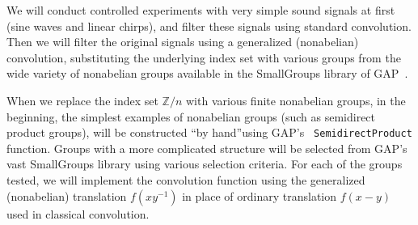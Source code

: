 \documentclass[10pt]{article}
\begin{document}
\vskip5mm

We will conduct controlled experiments with very simple sound signals at first
(sine waves and linear chirps), and filter these signals using
standard convolution.  Then we will filter the original signals using a
generalized (nonabelian) convolution, substituting the underlying index set with
various groups from the wide variety of nonabelian groups available in 
the SmallGroups library of GAP~\cite{GAP4}.   

When we replace the index set $\mathbb{Z}/n$ with various finite nonabelian
groups, in the beginning, the simplest examples of nonabelian groups (such as
semidirect product groups), will be constructed ``by hand''using GAP's {\tt
  SemidirectProduct} function.  Groups with a more complicated structure will be
selected from GAP's vast SmallGroups library using various selection criteria.
For each of the groups tested, we will implement the
convolution function using the generalized (nonabelian) translation $f(xy^{-1})$
in place of ordinary translation $f(x-y)$ used in classical convolution. 
\end{document}
